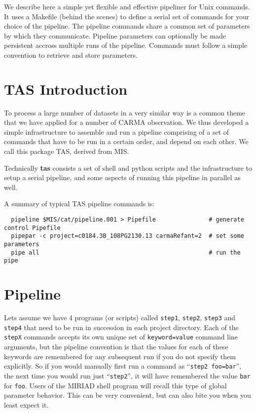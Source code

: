 \documentclass[preprint]{aastex} %
\begin{document}
We describe here a simple yet flexible and effective pipeliner for
Unix commands.  It uses a Makefile (behind the scenes) to define a
serial set of commands for your choice of the pipeline. The pipeline
commands share a common set of parameters by which they communicate.
Pipeline parameters can optionally be made persistent accross multiple
runs of the pipeline. Commands must follow a simple convention to
retrieve and store parameters.



\section{TAS Introduction}

To process a large number of datasets in a very similar 
way is a common theme that we have applied for a number of CARMA
observation. We thus developed
a simple infrastructure to assemble and run a pipeline comprising
of a set of commands that have to be run in a certain order,
and depend on each other. We call this 
package TAS, derived from MIS.

Technically {\bf tas} consists a set of shell and python scripts
and the infrastructure to setup a serial pipeline, and some aspects
of running this pipeline in parallel as well.

A summary of typical TAS pipeline commands is:

\footnotesize
\begin{verbatim}
  pipeline $MIS/cat/pipeline.001 > Pipefile               # generate control Pipefile
  pipepar -c project=c0184.3B_108PG2130.13 carmaRefant=2  # set some parameters
  pipe all                                                # run the pipe
\end{verbatim}
\normalsize   


\section{Pipeline}

Lets assume we have 4 programs (or scripts) called {\tt step1},
{\tt step2}, {\tt step3} and {\tt step4} that need to be run in
succession in each project directory. 
Each of the {\tt stepX} 
commands accepts its own unique set of {\tt keyword=value}
command line arguments, 
but the pipeline convention is that the values for each of these
keywords are remembered for any subsequent run if you do not
specify them explicitly. So if you would manually
first run a command as ``{\tt step2 foo=bar}'', 
the next time you would run just
``{\tt step2}'', it will have remembered the value
{\tt bar} for {\tt foo}. Users of the MIRIAD shell
program will recall this type of global parameter behavior. This
can be very convenient, but can also bite you when you least expect it.
\end{document}
